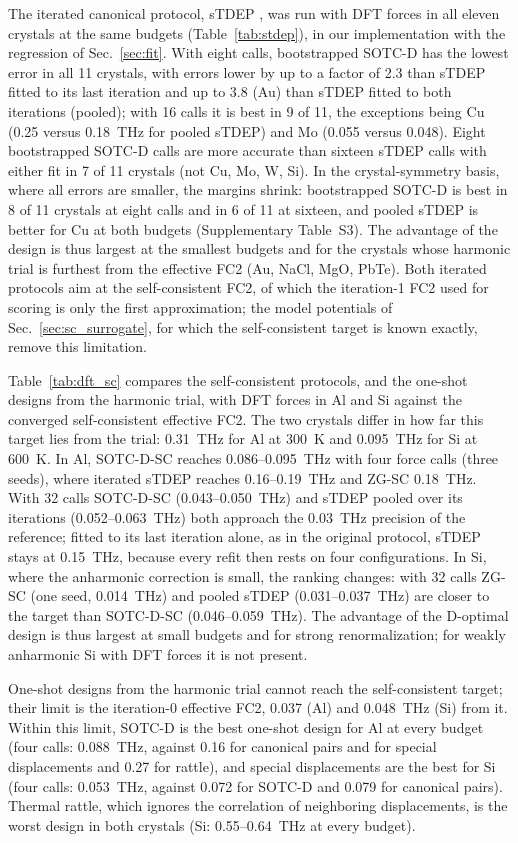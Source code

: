 \documentclass[aip,jap,reprint,amsmath,amssymb,floatfix]{revtex4-2}
\begin{document}
The iterated canonical protocol, sTDEP \cite{ref60}, was run with DFT forces
in all eleven crystals at the same budgets (Table~\ref{tab:stdep}), in our
implementation with the regression of Sec.~\ref{sec:fit}. With
eight calls, bootstrapped SOTC-D has the lowest error in all 11 crystals,
with errors lower by up to a factor of 2.3 than sTDEP fitted to its last
iteration and up to 3.8 (Au) than sTDEP fitted to both iterations (pooled);
with 16 calls it is best in 9 of 11,
the exceptions being Cu (0.25 versus 0.18~THz for pooled sTDEP) and Mo (0.055
versus 0.048). Eight bootstrapped SOTC-D calls are more accurate than sixteen
sTDEP calls with either fit in 7 of 11 crystals (not Cu, Mo, W, Si). In the
crystal-symmetry basis, where all errors are smaller, the margins shrink:
bootstrapped SOTC-D is best in 8 of 11 crystals at eight calls and in 6 of
11 at sixteen, and pooled sTDEP is better for Cu at both budgets
(Supplementary Table~S3). The advantage of the design is thus largest at the
smallest budgets and for the crystals whose harmonic trial is furthest from
the effective FC2 (Au, NaCl, MgO, PbTe). Both iterated protocols aim at
the self-consistent FC2, of which the iteration-1 FC2 used for scoring is
only the first approximation; the model potentials of
Sec.~\ref{sec:sc_surrogate}, for which the self-consistent target is known
exactly, remove this limitation.

Table~\ref{tab:dft_sc} compares the self-consistent protocols, and the
one-shot designs from the harmonic trial, with DFT forces in Al and Si
against the converged self-consistent effective FC2. The two crystals differ
in how far this target lies from the trial: 0.31~THz for Al at 300~K and
0.095~THz for Si at 600~K. In Al, SOTC-D-SC reaches 0.086--0.095~THz with
four force calls (three seeds), where iterated sTDEP reaches 0.16--0.19~THz
and ZG-SC 0.18~THz. With 32 calls SOTC-D-SC (0.043--0.050~THz) and sTDEP
pooled over its iterations (0.052--0.063~THz) both approach the 0.03~THz
precision of the reference; fitted to its last iteration alone, as in the
original protocol, sTDEP stays at 0.15~THz, because every refit then rests on
four configurations. In Si, where the anharmonic correction is small, the
ranking changes: with 32 calls ZG-SC (one seed, 0.014~THz) and pooled sTDEP
(0.031--0.037~THz) are closer to the target than SOTC-D-SC
(0.046--0.059~THz). The advantage of the D-optimal design is thus largest
at small budgets and for strong renormalization; for weakly anharmonic Si
with DFT forces it is not present.

One-shot designs from the harmonic trial cannot reach the self-consistent
target; their limit is the iteration-0 effective FC2, 0.037 (Al) and
0.048~THz (Si) from it. Within this limit, SOTC-D is the best one-shot design
for Al at every budget (four calls: 0.088~THz, against 0.16 for canonical
pairs and for special displacements and 0.27 for rattle), and special
displacements are the best for Si (four calls: 0.053~THz, against 0.072 for
SOTC-D and 0.079 for canonical pairs). Thermal rattle, which ignores the
correlation of neighboring displacements, is the worst design in both
crystals (Si: 0.55--0.64~THz at every budget).
\end{document}
